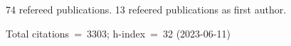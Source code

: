 74 refereed publications. 13 refeered publications as first author.

Total citations~=~3303; h-index~=~32 (2023-06-11)